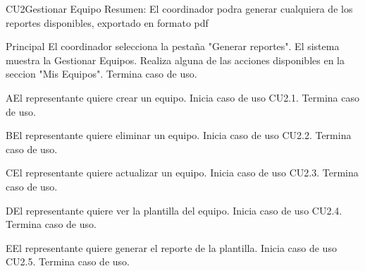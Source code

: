 	\begin{UseCase}{CU2}{Gestionar Equipo}{
		Resumen: El coordinador podra generar cualquiera de los reportes disponibles, exportado en formato pdf}
	\end{UseCase}
	\newpage
	
	\begin{UCtrayectoria}{Principal}
		\UCpaso[\UCactor] El coordinador selecciona la pestaña "Generar reportes". 
		\UCpaso El sistema muestra la  {Gestionar Equipos}.
		\UCpaso [\UCactor] Realiza alguna de las acciones disponibles en la seccion "Mis Equipos".       
		\UCpaso Termina caso de uso.
	\end{UCtrayectoria}

	\begin{UCtrayectoriaA}{A}{El representante quiere crear un equipo.}
		\UCpaso Inicia caso de uso CU2.1.
  		\UCpaso Termina caso de uso.
	\end{UCtrayectoriaA}

	\begin{UCtrayectoriaA}{B}{El representante quiere eliminar un equipo.}
		\UCpaso Inicia caso de uso CU2.2.
  		\UCpaso Termina caso de uso.
	\end{UCtrayectoriaA}
	
	\begin{UCtrayectoriaA}{C}{El representante quiere actualizar un equipo.}
		\UCpaso Inicia caso de uso CU2.3.
  		\UCpaso Termina caso de uso.
	\end{UCtrayectoriaA}
	
	\begin{UCtrayectoriaA}{D}{El representante quiere ver la plantilla del equipo.}
		\UCpaso Inicia caso de uso CU2.4.
  		\UCpaso Termina caso de uso.
	\end{UCtrayectoriaA}
	
	\begin{UCtrayectoriaA}{E}{El representante quiere generar el reporte de la plantilla.}
		\UCpaso Inicia caso de uso CU2.5.
  		\UCpaso Termina caso de uso.
	\end{UCtrayectoriaA}
	
	
